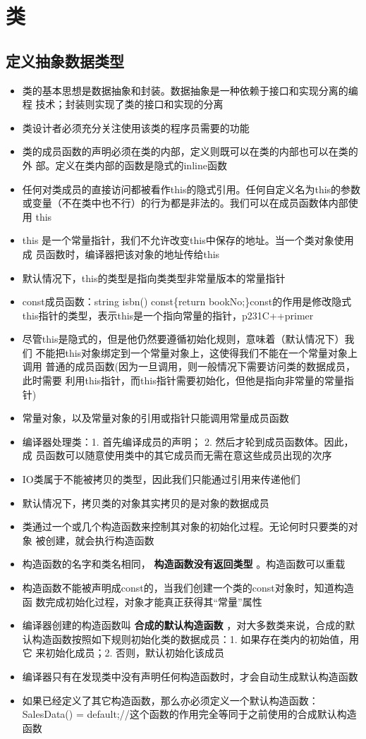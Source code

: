 \documentclass[11pt]{article}
\begin{document}
\section{类}
\label{sec-5}
\subsection{定义抽象数据类型}
\label{sec-5-1}
\begin{itemize}
\item 类的基本思想是数据抽象和封装。数据抽象是一种依赖于接口和实现分离的编程
技术；封装则实现了类的接口和实现的分离
\item 类设计者必须充分关注使用该类的程序员需要的功能
\item 类的成员函数的声明必须在类的内部，定义则既可以在类的内部也可以在类的外
部。定义在类内部的函数是隐式的inline函数
\item 任何对类成员的直接访问都被看作this的隐式引用。任何自定义名为this的参数
或变量（不在类中也不行）的行为都是非法的。我们可以在成员函数体内部使用
this
\item this 是一个常量指针，我们不允许改变this中保存的地址。当一个类对象使用成
员函数时，编译器把该对象的地址传给this
\item 默认情况下，this的类型是指向类类型非常量版本的常量指针
\item const成员函数：string isbn() const\{return bookNo;\}const的作用是修改隐式
this指针的类型，表示this是一个指向常量的指针，p231C++primer
\item 尽管this是隐式的，但是他仍然要遵循初始化规则，意味着（默认情况下）我们
不能把this对象绑定到一个常量对象上，这使得我们不能在一个常量对象上调用
普通的成员函数(因为一旦调用，则一般情况下需要访问类的数据成员，此时需要
利用this指针，而this指针需要初始化，但他是指向非常量的常量指针)
\item 常量对象，以及常量对象的引用或指针只能调用常量成员函数
\item 编译器处理类：1. 首先编译成员的声明； 2. 然后才轮到成员函数体。因此，成
员函数可以随意使用类中的其它成员而无需在意这些成员出现的次序
\item IO类属于不能被拷贝的类型，因此我们只能通过引用来传递他们
\item 默认情况下，拷贝类的对象其实拷贝的是对象的数据成员
\item 类通过一个或几个构造函数来控制其对象的初始化过程。无论何时只要类的对象
被创建，就会执行构造函数
\item 构造函数的名字和类名相同， \textbf{构造函数没有返回类型} 。构造函数可以重载
\item 构造函数不能被声明成const的，当我们创建一个类的const对象时，知道构造函
数完成初始化过程，对象才能真正获得其“常量”属性
\item 编译器创建的构造函数叫 \textbf{合成的默认构造函数} ，对大多数类来说，合成的默
认构造函数按照如下规则初始化类的数据成员：1. 如果存在类内的初始值，用它
来初始化成员；2. 否则，默认初始化该成员
\item 编译器只有在发现类中没有声明任何构造函数时，才会自动生成默认构造函数
\item 如果已经定义了其它构造函数，那么亦必须定义一个默认构造函数：
SalesData() = default;//这个函数的作用完全等同于之前使用的合成默认构造
函数
\end{itemize}
\end{document}
